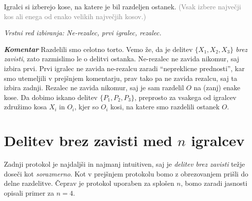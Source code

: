 \documentclass[a4paper,12pt]{article}
\begin{document}
\begin{protokol}
\item Igralci si izberejo kose, na katere je bil razdeljen ostanek. \textcolor{gray}{(Vsak izbere največji kos ali enega od enako velikih največjih kosov.)}

\textsl{Vrstni red izbiranja: Ne-rezalec, prvi igralec, rezalec.}

\item [\textbf{\em Komentar}] Razdelili smo celotno torto. Vemo že, da je delitev ${\{X_1, X_2, X_3\}}$ {\em brez zavisti}, zato razmislimo le o delitvi ostanka. Ne-rezalec ne zavida nikomur, saj izbira prvi. Prvi igralec ne zavida ne-rezalcu zaradi ``nepreklicne prednosti'', kar smo utemeljili v prejšnjem komentarju, prav tako pa ne zavida rezalcu, saj ta izbira zadnji. Rezalec ne zavida nikomur, saj je sam razdelil $O$ na (zanj) enake kose. Da dobimo iskano delitev ${\{P_1, P_2, P_3\}}$, preprosto za vsakega od igralcev združimo kosa $X_i$ in $O_i$, kjer so $O_i$ kosi, na katere smo razdelili ostanek $O$.

\end{protokol}

\section{Delitev brez zavisti med $n$ igralcev}

Zadnji protokol je najdaljši in najmanj intuitiven, saj je {\em delitev brez zavisti} težje doseči kot {\em sorazmerno}. Kot v prejšnjem protokolu bomo z obrezovanjem prišli do delne razdelitve.
Čeprav je protokol uporaben za splošen $n$, bomo zaradi jasnosti opisali primer za $n = 4$. 
\end{document}
